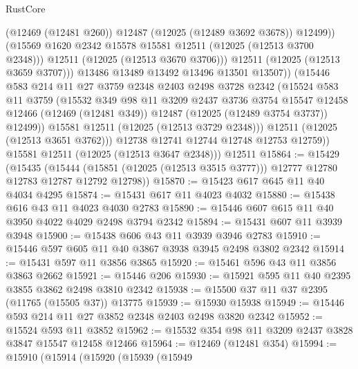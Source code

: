 \begin{lexlean}{RustCore}
\begin{coremodule}
                        (@12469 (@12481 @260))
                        @12487
                        (@12025 (@12489 @3692 @3678))
                        @12499))
                    (@15569 @1620 @2342 @15578 @15581 @12511 (@12025 (@12513 @3700 @2348)))
                    @12511
                    (@12025 (@12513 @3670 @3706)))
                  @12511
                  (@12025 (@12513 @3659 @3707)))
                @13486
                @13489
                @13492
                @13496
                @13501
                @13507))
            (@15446
              @583
              @214
              @11
              @27
              @3759
              @2348
              @2403
              @2498
              @3728
              @2342
              (@15524
                @583
                @11
                @3759
                (@15532
                  @349
                  @98
                  @11
                  @3209
                  @2437
                  @3736
                  @3754
                  @15547
                  @12458
                  @12466
                  (@12469 (@12481 @349))
                  @12487
                  (@12025 (@12489 @3754 @3737))
                  @12499))
              @15581
              @12511
              (@12025 (@12513 @3729 @2348)))
            @12511
            (@12025 (@12513 @3651 @3762)))
          @12738
          @12741
          @12744
          @12748
          @12753
          @12759))
      @15581
      @12511
      (@12025 (@12513 @3647 @2348)))
    @12511
@15864 := @15429
    (@15435
      (@15444 (@15851 (@12025 (@12513 @3515 @3777))) @12777 @12780 @12783 @12787 @12792 @12798))
@15870 := @15423 @617 @645 @11 @40 @4034 @4295
@15874 := @15431 @617 @11 @4023 @4032
@15880 := @15438 @616 @43 @11 @4023 @4030 @2783
@15890 := @15446 @607 @615 @11 @40 @3950 @4022 @4029 @2498 @3794 @2342
@15894 := @15431 @607 @11 @3939 @3948
@15900 := @15438 @606 @43 @11 @3939 @3946 @2783
@15910 := @15446 @597 @605 @11 @40 @3867 @3938 @3945 @2498 @3802 @2342
@15914 := @15431 @597 @11 @3856 @3865
@15920 := @15461 @596 @43 @11 @3856 @3863 @2662
@15921 := @15446 @206
@15930 := @15921 @595 @11 @40 @2395 @3855 @3862 @2498 @3810 @2342
@15938 := @15500 @37 @11 @37 @2395 (@11765 (@15505 @37)) @13775
@15939 := @15930 @15938
@15949 := @15446 @593 @214 @11 @27 @3852 @2348 @2403 @2498 @3820 @2342
@15952 := @15524 @593 @11 @3852
@15962 := @15532 @354 @98 @11 @3209 @2437 @3828 @3847 @15547 @12458 @12466
@15964 := @12469 (@12481 @354)
@15994 := @15910
    (@15914
      (@15920
        (@15939
          (@15949

\end{coremodule}
\end{lexlean}
